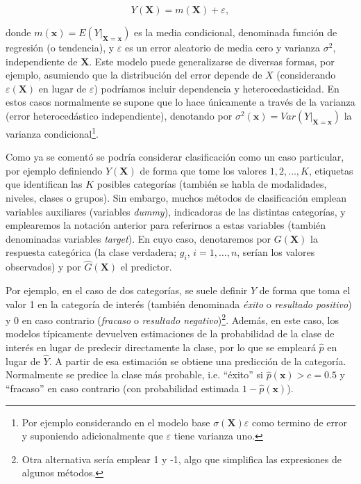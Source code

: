 \documentclass[]{book}
\theoremstyle{break}
\theoremstyle{definition}
\theoremstyle{definition}
\theoremstyle{definition}
\theoremstyle{remark}
\begin{document}
\begin{equation} 
  Y(\mathbf{X})=m(\mathbf{X})+\varepsilon,
  \label{eq:modelogeneral}
\end{equation}

donde
\(m(\mathbf{x}) = E\left( \left. Y\right\vert_{\mathbf{X}=\mathbf{x}} \right)\)
es la media condicional, denominada función de regresión (o tendencia),
y \(\varepsilon\) es un error aleatorio de media cero y varianza
\(\sigma^2\), independiente de \(\mathbf{X}\). Este modelo puede
generalizarse de diversas formas, por ejemplo, asumiendo que la
distribución del error depende de \(X\) (considerando
\(\varepsilon(\mathbf{X})\) en lugar de \(\varepsilon\)) podríamos
incluir dependencia y heterocedasticidad. En estos casos normalmente se
supone que lo hace únicamente a través de la varianza (error
heterocedástico independiente), denotando por
\(\sigma^2(\mathbf{x}) = Var\left( \left. Y\right\vert_{\mathbf{X}=\mathbf{x}} \right)\)
la varianza condicional\footnote{Por ejemplo considerando en el modelo
  base \(\sigma(\mathbf{X})\varepsilon\) como termino de error y
  suponiendo adicionalmente que \(\varepsilon\) tiene varianza uno.}.

Como ya se comentó se podría considerar clasificación como un caso
particular, por ejemplo definiendo \(Y\left(\mathbf{X} \right)\) de
forma que tome los valores \(1, 2, \ldots, K\), etiquetas que
identifican las \(K\) posibles categorías (también se habla de
modalidades, niveles, clases o grupos). Sin embargo, muchos métodos de
clasificación emplean variables auxiliares (variables \emph{dummy}),
indicadoras de las distintas categorías, y emplearemos la notación
anterior para referirnos a estas variables (también denominadas
variables \emph{target}). En cuyo caso, denotaremos por
\(G \left(\mathbf{X} \right)\) la respuesta categórica (la clase
verdadera; \(g_i\), \(i =1, \ldots, n\), serían los valores observados)
y por \(\hat G \left(\mathbf{X} \right)\) el predictor.

Por ejemplo, en el caso de dos categorías, se suele definir \(Y\) de
forma que toma el valor 1 en la categoría de interés (también denominada
\emph{éxito} o \emph{resultado positivo}) y 0 en caso contrario
(\emph{fracaso} o \emph{resultado negativo})\footnote{Otra alternativa
  sería emplear 1 y -1, algo que simplifica las expresiones de algunos
  métodos.}. Además, en este caso, los modelos típicamente devuelven
estimaciones de la probabilidad de la clase de interés en lugar de
predecir directamente la clase, por lo que se empleará \(\hat p\) en
lugar de \(\hat Y\). A partir de esa estimación se obtiene una
predicción de la categoría. Normalmente se predice la clase más
probable, i.e. ``éxito'' si \(\hat p(\mathbf{x}) > c = 0.5\) y
``fracaso'' en caso contrario (con probabilidad estimada
\(1 - \hat p(\mathbf{x})\)).
\end{document}
